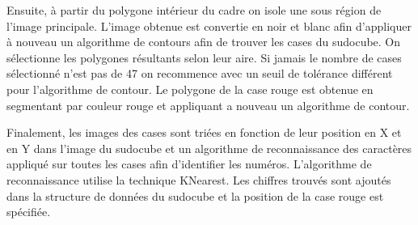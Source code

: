 Ensuite, à partir du polygone intérieur du cadre on isole une sous région de l'image principale. L'image obtenue est convertie en noir et blanc afin d'appliquer à nouveau un algorithme de contours afin de trouver les cases du sudocube. On sélectionne les polygones résultants selon leur aire. Si jamais le nombre de cases sélectionné n'est pas de 47 on recommence avec un seuil de tolérance différent pour l'algorithme de contour. Le polygone de la case rouge est obtenue en segmentant par couleur rouge et appliquant a nouveau un algorithme de contour. 

Finalement, les images des cases sont triées en fonction de leur position en X et en Y dans l'image du sudocube et un algorithme de reconnaissance des caractères appliqué sur toutes les cases afin d'identifier les numéros. L'algorithme de reconnaissance utilise la technique KNearest. Les chiffres trouvés sont ajoutés dans la structure de données du sudocube et la position de la case rouge est spécifiée.